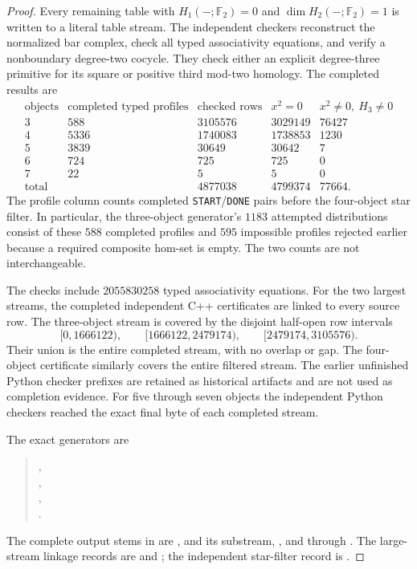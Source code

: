 \begin{proof}
Every remaining table with $H_1(-;\mathbb F_2)=0$ and
$\dim H_2(-;\mathbb F_2)=1$ is written to a literal table
stream.  The independent checkers reconstruct the normalized
bar complex, check all typed associativity equations, and
verify a nonboundary degree-two cocycle.  They check either
an explicit degree-three primitive for its square or positive
third mod-two homology.  The completed results are
\[
\begin{array}{c|r|r|r|r}
\text{objects}&\text{completed typed profiles}&\text{checked rows}
 &x^2=0&x^2\ne0,\ H_3\ne0\\\hline
3&588&3105576&3029149&76427\\
4&5336&1740083&1738853&1230\\
5&3839&30649&30642&7\\
6&724&725&725&0\\
7&22&5&5&0\\\hline
\text{total}&&4877038&4799374&77664.
\end{array}
\]
The profile column counts completed \texttt{START}/\texttt{DONE}
pairs before the four-object star filter.  In particular, the
three-object generator's $1183$ attempted distributions consist
of these $588$ completed profiles and $595$ impossible profiles
rejected earlier because a required composite hom-set is empty.
The two counts are not interchangeable.

The checks include $2055830258$ typed associativity equations.
For the two largest streams, the completed independent C++
certificates are linked to every source row.  The three-object
stream is covered by the disjoint half-open row intervals
\[
 [0,1666122),\qquad[1666122,2479174),\qquad
 [2479174,3105576).
\]
Their union is the entire completed stream, with no overlap
or gap.  The four-object certificate similarly covers the
entire filtered stream.  The earlier unfinished Python checker
prefixes are retained as historical artifacts and are not used
as completion evidence.  For five through seven objects the
independent Python checkers reached the exact final byte of
each completed stream.

The exact generators are
\begin{quote}\small
{},\\
,\\
,\\
.
\end{quote}
The complete output stems in  are
,
 and its
 substream,
, and
 through
.
The large-stream linkage records are
 and
; the
independent star-filter record is
.


\end{proof}
